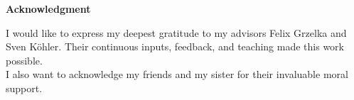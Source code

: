 \vspace*{\fill}
\begin{center}\textsf{\textbf{Acknowledgment}}\end{center}

I would like to express my deepest gratitude to my advisors Felix Grzelka and Sven Köhler. 
Their continuous inputs, feedback, and teaching made this work possible. \\

I also want to acknowledge my friends and my sister for their invaluable moral support.\vspace*{\fill}